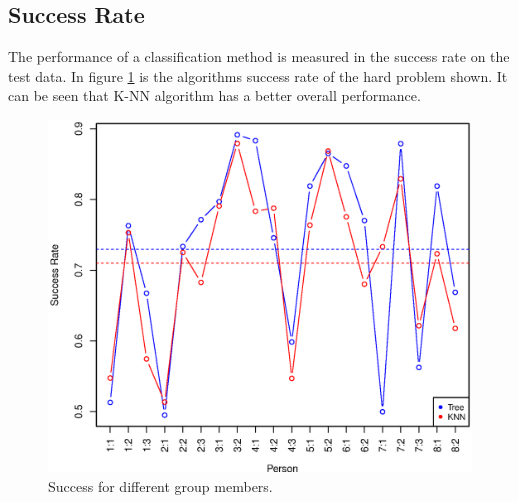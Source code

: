 \subsection{Success Rate}
The performance of a classification method is measured in the success rate on the test data.
In figure \ref{fig:success_comparison_hard} is the algorithms success rate of the hard problem shown.
It can be seen that K-NN algorithm has a better overall performance.

\begin{figure}[H]
\centering
\includegraphics[width=\textwidth]{graphics/success_comp_hard}
\caption{Success for different group members.}
\label{fig:success_comparison_hard}
\end{figure}

